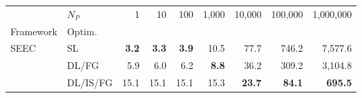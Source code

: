 \begin{tabular}{llrrrrrrr}
\toprule
 & $N_P$ & 1 & 10 & 100 & 1,000 & 10,000 & 100,000 & 1,000,000 \\
Framework & Optim. &  &  &  &  &  &  &  \\
\midrule
\multirow[c]{3}{*}{SEEC} & SL & \bfseries 3.2 & \bfseries 3.3 & \bfseries 3.9 & 10.5 & 77.7 & 746.2 & 7,577.6 \\
 & DL/FG & 5.9 & 6.0 & 6.2 & \bfseries 8.8 & 36.2 & 309.2 & 3,104.8 \\
 & DL/IS/FG & 15.1 & 15.1 & 15.1 & 15.3 & \bfseries 23.7 & \bfseries 84.1 & \bfseries 695.5 \\
\bottomrule
\end{tabular}

